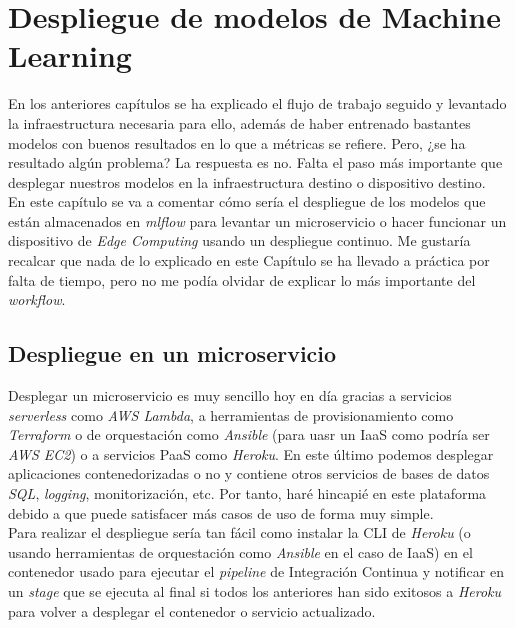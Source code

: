 \chapter{Despliegue de modelos de Machine Learning}\label{chap:deploy}

En los anteriores capítulos se ha explicado el flujo de trabajo seguido y levantado la infraestructura necesaria para ello, además de haber entrenado bastantes modelos con buenos resultados en lo que a métricas se refiere. Pero, ¿se ha resultado algún problema? La respuesta es no. Falta el paso más importante que desplegar nuestros modelos en la infraestructura destino o dispositivo destino.\\

En este capítulo se va a comentar cómo sería el despliegue de los modelos que están almacenados en \textit{mlflow} para levantar un microservicio o hacer funcionar un dispositivo de \textit{Edge Computing} usando un despliegue continuo. Me gustaría recalcar que nada de lo explicado en este Capítulo se ha llevado a práctica por falta de tiempo, pero no me podía olvidar de explicar lo más importante del \textit{workflow}.\\

\section{Despliegue en un microservicio}

Desplegar un microservicio es muy sencillo hoy en día gracias a servicios \textit{serverless} como \textit{AWS Lambda}, a herramientas de provisionamiento como \textit{Terraform} o de orquestación como \textit{Ansible} \cite{ansible} (para uasr un IaaS como podría ser \textit{AWS EC2}) o a servicios PaaS como \textit{Heroku}. En este último podemos desplegar aplicaciones contenedorizadas o no y contiene otros servicios de bases de datos \textit{SQL}, \textit{logging}, monitorización, etc. Por tanto, haré hincapié en este plataforma debido a que puede satisfacer más casos de uso de forma muy simple.\\

Para realizar el despliegue sería tan fácil como instalar la CLI de \textit{Heroku} (o usando herramientas de orquestación como \textit{Ansible} en el caso de IaaS) en el contenedor usado para ejecutar el \textit{pipeline} de Integración Continua y notificar en un \textit{stage} que se ejecuta al final si todos los anteriores han sido exitosos a \textit{Heroku} para volver a desplegar el contenedor o servicio actualizado.\\

